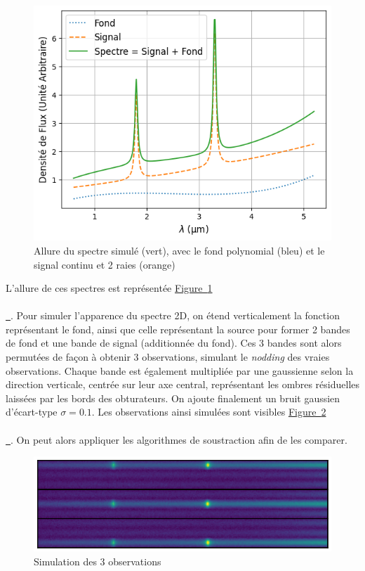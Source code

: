 \documentclass[12pt, a4paper]{article}
\newcommand*{\figref}[2][]{%
  \hyperref[{#2}]{%
    Figure~\ref*{#2}%
    \ifx\\#1\\%
    \else
      \,#1%
    \fi
  }%
}
\begin{document}
\begin{figure}
  \centering
  \includegraphics[scale=0.55]{assets/spectre_simulation.png}
  \caption{Allure du spectre simulé (vert), avec le fond polynomial (bleu) et le signal continu et 2 raies (orange)}
  \label{fig:simulated_spectrum}
\end{figure}

L'allure de ces spectres est représentée \figref{fig:simulated_spectrum}. Pour simuler l'apparence du spectre 2D, on étend verticalement la fonction représentant le fond, ainsi que celle représentant la source pour former 2 bandes de fond et une bande de signal (additionnée du fond). Ces 3 bandes sont alors permutées de façon à obtenir 3 observations, simulant le \textit{nodding} des vraies observations. Chaque bande est également multipliée par une gaussienne selon la direction verticale, centrée sur leur axe central, représentant les ombres résiduelles laissées par les bords des obturateurs. On ajoute finalement un bruit gaussien d'écart-type $\sigma = 0.1$. Les observations ainsi simulées sont visibles \figref{fig:simulated_observations}. On peut alors appliquer les algorithmes de soustraction afin de les comparer.

\begin{figure}[H]
  \centering
  \includegraphics[scale=0.8]{assets/simulated_image.png}
  \caption{Simulation des 3 observations}
  \label{fig:simulated_observations}
\end{figure}
\end{document}
